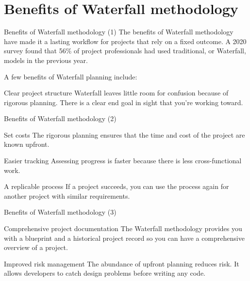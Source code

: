 \documentclass[
    notheorems,
    11pt,
    compress,
    aspectratio=169
]{beamer}
\begin{document}

\section{Benefits of Waterfall methodology}

\begin{frame}{Benefits of Waterfall methodology (1)}
    The benefits of Waterfall methodology have made it a lasting workflow for projects that rely on a fixed outcome. A 2020 survey found that 56\% of project professionals had used traditional, or Waterfall, models in the previous year.

    \pause
    \vfill

    A few benefits of Waterfall planning include:

    \begin{block}{Clear project structure}
        Waterfall leaves little room for confusion because of rigorous planning. There is a clear end goal in sight that you’re working toward.
    \end{block}
\end{frame}

\begin{frame}{Benefits of Waterfall methodology (2)}
    \begin{block}{Set costs}
        The rigorous planning ensures that the time and cost of the project are known upfront.
    \end{block}

    \pause
    \vfill

    \begin{block}{Easier tracking}
        Assessing progress is faster because there is less cross-functional work.
    \end{block}

    \pause
    \vfill

    \begin{block}{A replicable process}
        If a project succeeds, you can use the process again for another project with similar requirements.
    \end{block}
\end{frame}

\begin{frame}{Benefits of Waterfall methodology (3)}
    \begin{block}{Comprehensive project documentation}
        The Waterfall methodology provides you with a blueprint and a historical project record so you can have a comprehensive overview of a project.
    \end{block}

    \pause
    \vfill

    \begin{block}{Improved risk management}
        The abundance of upfront planning reduces risk. It allows developers to catch design problems before writing any code.
    \end{block}
\end{frame}
\end{document}

